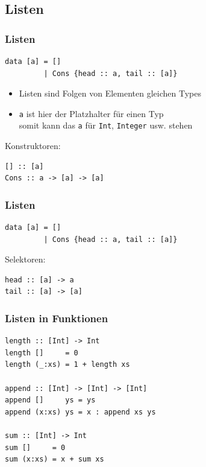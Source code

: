\documentclass[fleqn,11pt,aspectratio=43]{beamer}
\begin{document}
\subsection{Listen}
\begin{frame}[fragile]
\frametitle{Listen}
\begin{lstlisting}
data [a] = []
         | Cons {head :: a, tail :: [a]}
\end{lstlisting}
\begin{block}{\vspace*{-3ex}}
\begin{itemize}
  \item Listen sind Folgen von Elementen gleichen Types
  \item \lstinline|a| ist hier der Platzhalter für einen Typ\\
  		somit kann das \lstinline|a| für \lstinline|Int|, \lstinline|Integer| usw. stehen
\end{itemize}
\end{block}  		
Konstruktoren: 
\pause
\begin{lstlisting}
[] :: [a]
Cons :: a -> [a] -> [a]
\end{lstlisting}
\end{frame}

\begin{frame}[fragile]
\frametitle{Listen}
\begin{lstlisting}
data [a] = []
         | Cons {head :: a, tail :: [a]}
\end{lstlisting}
Selektoren: 
\pause
\begin{lstlisting}
head :: [a] -> a
tail :: [a] -> [a]
\end{lstlisting}
\end{frame}

\begin{frame}[fragile]
\frametitle{Listen in Funktionen}
\begin{lstlisting}
length :: [Int] -> Int
length []     = 0
length (_:xs) = 1 + length xs

append :: [Int] -> [Int] -> [Int]
append []     ys = ys
append (x:xs) ys = x : append xs ys

sum :: [Int] -> Int
sum []     = 0
sum (x:xs) = x + sum xs
\end{lstlisting}
\end{frame}
\end{document}

